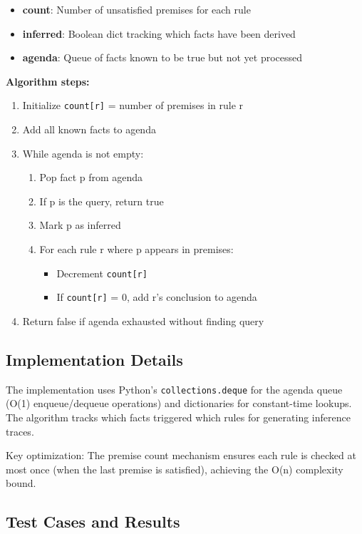 \documentclass[letterpaper]{article}
\begin{document}
\begin{itemize}
\item \textbf{count}: Number of unsatisfied premises for each rule
\item \textbf{inferred}: Boolean dict tracking which facts have been derived
\item \textbf{agenda}: Queue of facts known to be true but not yet processed
\end{itemize}

\textbf{Algorithm steps:}
\begin{enumerate}
\item Initialize \texttt{count[r]} = number of premises in rule r
\item Add all known facts to agenda
\item While agenda is not empty:
   \begin{enumerate}
   \item Pop fact p from agenda
   \item If p is the query, return true
   \item Mark p as inferred
   \item For each rule r where p appears in premises:
      \begin{itemize}
      \item Decrement \texttt{count[r]}
      \item If \texttt{count[r]} = 0, add r's conclusion to agenda
      \end{itemize}
   \end{enumerate}
\item Return false if agenda exhausted without finding query
\end{enumerate}

\subsection{Implementation Details}

The implementation uses Python's \texttt{collections.deque} for the agenda queue (O(1) enqueue/dequeue operations) and dictionaries for constant-time lookups. The algorithm tracks which facts triggered which rules for generating inference traces.

Key optimization: The premise count mechanism ensures each rule is checked at most once (when the last premise is satisfied), achieving the O(n) complexity bound.

\subsection{Test Cases and Results}
\end{document}
